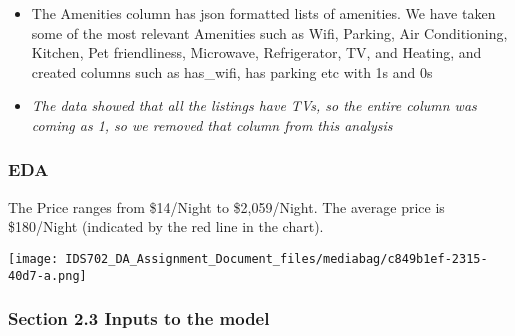 \documentclass[
  letterpaper,
  DIV=11,
  numbers=noendperiod]{scrartcl}
\providecommand{\tightlist}{%
  \setlength{\itemsep}{0pt}\setlength{\parskip}{0pt}}\usepackage{longtable,booktabs,array}
\begin{document}
\begin{itemize}
  \begin{itemize}
  \tightlist
  \item
    The Amenities column has json formatted lists of amenities. We have
    taken some of the most relevant Amenities such as Wifi, Parking, Air
    Conditioning, Kitchen, Pet friendliness, Microwave, Refrigerator,
    TV, and Heating, and created columns such as has\_wifi, has parking
    etc with 1s and 0s
  \item
    \emph{The data showed that all the listings have TVs, so the entire
    column was coming as 1, so we removed that column from this
    analysis}
  \end{itemize}
\end{itemize}

\hypertarget{eda}{%
\subsubsection{EDA}\label{eda}}

The Price ranges from \$14/Night to \$2,059/Night. The average price is
\$180/Night (indicated by the red line in the chart).

\texttt{[image: IDS702\_DA\_Assignment\_Document\_files/mediabag/c849b1ef-2315-40d7-a.png]}

\hypertarget{section-2.3-inputs-to-the-model}{%
\subsubsection{Section 2.3 Inputs to the
model}\label{section-2.3-inputs-to-the-model}}
\end{document}
